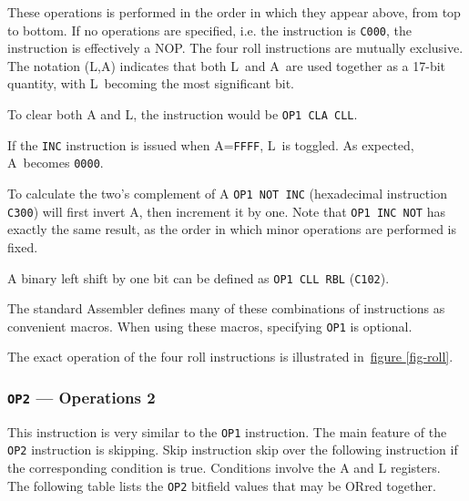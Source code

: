 \documentclass[11pt,a4paper,twocolumns]{article}
\newcommand{\npcf}[2][section]{\hyperref[#2]{#1 \ref*{#2}}}
\newcommand{\npfcf}[1]{\npcf[figure]{#1}}
\newcommand\register[1]{\textsf{#1}}
\newcommand\A{\register{A}}
\newcommand\Lreg{\register{L}}
\begin{document}
These operations is performed in the order in which they appear above,
from top to bottom. If no operations are specified, i.e. the
instruction is {\tt C000}, the instruction is effectively a NOP. The
four roll instructions are mutually exclusive. The notation (\Lreg,\A)
indicates that both \Lreg\ and \A\ are used together as a 17-bit
quantity, with \Lreg\ becoming the most significant bit.

To clear both A and L, the instruction would be {\tt OP1 CLA CLL}.

If the {\tt INC} instruction is issued when \A={\tt FFFF}, \Lreg\ is
toggled. As expected, \A\ becomes {\tt 0000}.

To calculate the two's complement of A {\tt OP1 NOT INC} (hexadecimal
instruction {\tt C300}) will first invert A, then increment it by
one. Note that {\tt OP1 INC NOT} has exactly the same result, as the
order in which minor operations are performed is fixed.

A binary left shift by one bit can be defined as {\tt OP1 CLL RBL}
({\tt C102}).

The standard Assembler defines many of these combinations of 
instructions as
convenient macros. When using these macros, specifying {\tt OP1} is
optional.

The exact operation of the four roll instructions is illustrated
in~\npfcf{fig-roll}.

\subsubsection{{\tt OP2} — Operations 2}
\label{sec-op2}

This instruction is very similar to the {\tt OP1} instruction. The
main feature of the {\tt OP2} instruction is skipping. Skip
instruction skip over the following instruction if the corresponding
condition is true. Conditions involve the A and L registers. The
following table lists the {\tt OP2} bitfield values that may be ORred
together.
\end{document}
